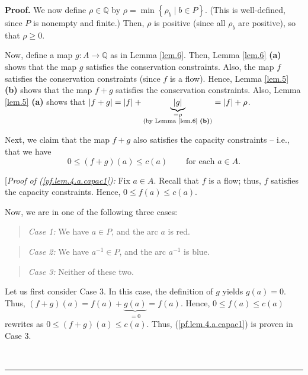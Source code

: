 \documentclass[numbers=enddot,12pt,final,onecolumn,notitlepage]{scrartcl}%
\theoremstyle{definition}
\newenvironment{statement}{\begin{quote}}{\end{quote}}
\newenvironment{proof}[1][Proof]{\noindent\textbf{#1.} }{\ \rule{0.5em}{0.5em}}
\begin{document}
\begin{proof}
We now define $\rho\in\mathbb{Q}$ by $\rho=\min\left\{  \rho_{b}\mid b\in
P\right\}  $. (This is well-defined, since $P$ is nonempty and finite.) Then,
$\rho$ is positive (since all $\rho_{b}$ are positive), so that $\rho\geq0$.

Now, define a map $g:A\rightarrow\mathbb{Q}$ as in Lemma \ref{lem.6}. Then,
Lemma \ref{lem.6} \textbf{(a)} shows that the map $g$ satisfies the
conservation constraints. Also, the map $f$ satisfies the conservation
constraints (since $f$ is a flow). Hence, Lemma \ref{lem.5} \textbf{(b)} shows
that the map $f+g$ satisfies the conservation constraints. Also, Lemma
\ref{lem.5} \textbf{(a)} shows that $\left\vert f+g\right\vert =\left\vert
f\right\vert +\underbrace{\left\vert g\right\vert }_{\substack{=\rho
\\\text{(by Lemma \ref{lem.6} \textbf{(b)})}}}=\left\vert f\right\vert +\rho$.

Next, we claim that the map $f+g$ also satisfies the capacity constraints --
i.e., that we have%
\begin{equation}
0\leq\left(  f+g\right)  \left(  a\right)  \leq c\left(  a\right)
\ \ \ \ \ \ \ \ \ \ \text{for each }a\in A. \label{pf.lem.4.a.capac1}%
\end{equation}


[\textit{Proof of (\ref{pf.lem.4.a.capac1}):} Fix $a\in A$. Recall that $f$ is
a flow; thus, $f$ satisfies the capacity constraints. Hence, $0\leq f\left(
a\right)  \leq c\left(  a\right)  $.

Now, we are in one of the following three cases:

\begin{statement}
\textit{Case 1:} We have $a\in P$, and the arc $a$ is red.
\end{statement}

\begin{statement}
\textit{Case 2:} We have $a^{-1}\in P$, and the arc $a^{-1}$ is blue.
\end{statement}

\begin{statement}
\textit{Case 3:} Neither of these two.
\end{statement}

Let us first consider Case 3. In this case, the definition of $g$ yields
$g\left(  a\right)  =0$. Thus, $\left(  f+g\right)  \left(  a\right)
=f\left(  a\right)  +\underbrace{g\left(  a\right)  }_{=0}=f\left(  a\right)
$. Hence, $0\leq f\left(  a\right)  \leq c\left(  a\right)  $ rewrites as
$0\leq\left(  f+g\right)  \left(  a\right)  \leq c\left(  a\right)  $. Thus,
(\ref{pf.lem.4.a.capac1}) is proven in Case 3.


\end{proof}
\end{document}
